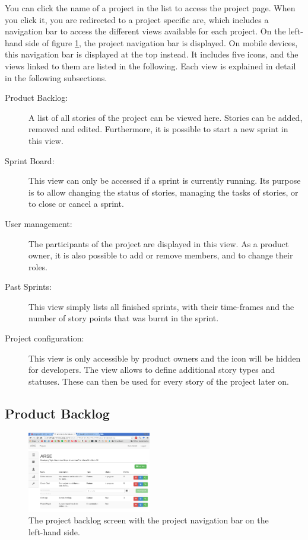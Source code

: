 \documentclass[
	accentcolor=tud1a %
]{tudreport}
\begin{document}
You can click the name of a project in the list to access the project page. When you click it, you are redirected to a project specific are, which includes a navigation bar to access the different views available for each project. On the left-hand side of figure \ref{fig:project-backlog}, the project navigation bar is displayed. On mobile devices, this navigation bar is displayed at the top instead. It includes five icons, and the views linked to them are listed in the following. Each view is explained in detail in the following subsections.
\begin{description}
	\item[Product Backlog:] A list of all stories of the project can be viewed here. Stories can be added, removed and edited. Furthermore, it is possible to start a new sprint in this view.
	\item[Sprint Board:] This view can only be accessed if a sprint is currently running. Its purpose is to allow changing the status of stories, managing the tasks of stories, or to close or cancel a sprint.
	\item[User management:] The participants of the project are displayed in this view. As a product owner, it is also possible to add or remove members, and to change their roles.
	\item[Past Sprints:] This view simply lists all finished sprints, with their time-frames and the number of story points that was burnt in the sprint.
	\item[Project configuration:] This view is only accessible by product owners and the icon will be hidden for developers. The view allows to define additional story types and statuses. These can then be used for every story of the project later on.
\end{description}


\subsection{Product Backlog}
\label{sec:backlog}


\begin{figure}
	\centering
	\includegraphics[width=0.48\textwidth]{img/backlog}
	\caption{The project backlog screen with the project navigation bar on the left-hand side.}
	\label{fig:project-backlog}
\end{figure}
\end{document}
